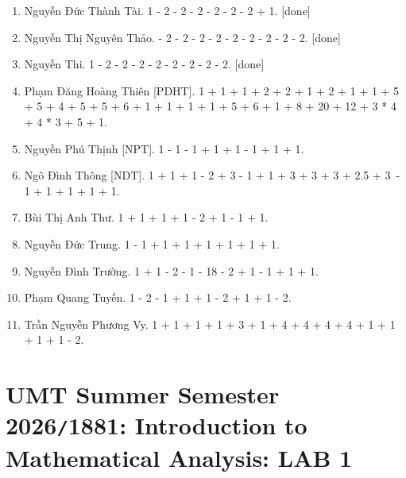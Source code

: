 \documentclass{article}
\begin{document}
\begin{enumerate}
	\item {\sc Nguyễn Đức Thành Tài.} 1 - 2 - 2 - 2 - 2 - 2 - 2 + 1. [done]
	\item {\sc Nguyễn Thị Nguyên Thảo.} - 2 - 2 - 2 - 2 - 2 - 2 - 2 - 2 - 2. [done]
	\item {\sc Nguyễn Thi.} 1 - 2 - 2 - 2 - 2 - 2 - 2 - 2 - 2. [done]
	\item {\sc Phạm Đăng Hoàng Thiên [PDHT].} 1 + 1 + 1 + 2 + 2 + 1 + 2 + 1 + 1 + 5 + 5 + 4 + 5 + 5 + 6 + 1 + 1 + 1 + 1 + 5 + 6 + 1 + 8 + 20 + 12 + 3 * 4 + 4 * 3 + 5 + 1.
	\item {\sc Nguyễn Phú Thịnh [NPT].} 1 - 1 - 1 + 1 + 1 - 1 + 1 + 1.
	\item {\sc Ngô Đình Thông [NDT].} 1 + 1 + 1 - 2 + 3 - 1 + 1 + 3 + 3 + 3 + 2.5 + 3 - 1 + 1 + 1 + 1 + 1.
	\item {\sc Bùi Thị Anh Thư.} 1 + 1 + 1 + 1 - 2 + 1 - 1 + 1.
	\item {\sc Nguyễn Đức Trung.} 1 - 1 + 1 + 1 + 1 + 1 + 1 + 1.
	\item {\sc Nguyễn Đình Trường.} 1 + 1 - 2 - 1 - 18 - 2 + 1 - 1 + 1 + 1.
	\item {\sc Phạm Quang Tuyến.} 1 - 2 - 1 + 1 + 1 - 2 + 1 + 1 - 2.
	\item {\sc Trần Nguyễn Phương Vy.} 1 + 1 + 1 + 1 + 3 + 1 + 4 + 4 + 4 + 4 + 1 + 1 + 1 + 1 - 2.
\end{enumerate}


\section{UMT Summer Semester 2026{\tt/}1881: Introduction to Mathematical Analysis: LAB 1}
\end{document}
